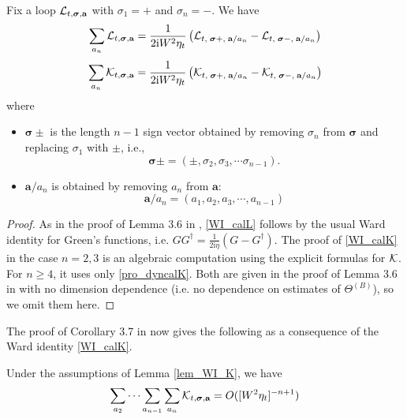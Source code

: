\begin{lemma}\label{lem_WI_K} Fix a loop ${\cal L}_{t, \boldsymbol{\sigma}, \textbf{a}}$ with 
$\sigma_1=+$ and $\sigma_n=-$. We have
\begin{equation}\label{WI_calL}
  \sum_{a_n}{\cal L}_{t, \boldsymbol{\sigma}, \textbf{a}}=
\frac{1}{2\mathrm{i}W^{2}\eta_t}\left({\cal L}_{t, \; \boldsymbol{\sigma}+,  \; \textbf{a}/a_n}- {\cal L}_{t, \; \boldsymbol{\sigma}-,  \; \textbf{a}/a_n}\right)  
\end{equation}
\begin{equation}\label{WI_calK}
  \sum_{a_n}{\cal K}_{t, \boldsymbol{\sigma}, \textbf{a}}=
\frac{1}{2\mathrm{i}W^{2}\eta_t}\left({\cal K}_{t, \; \boldsymbol{\sigma}+,  \; \textbf{a}/a_n}
- {\cal K}_{t, \; \boldsymbol{\sigma}-,  \; \textbf{a}/a_n}\right)  
\end{equation}
where 
\begin{itemize}
\item  $\boldsymbol{\sigma}\pm$ is the length $n-1$ sign vector obtained by removing $\sigma_n$ from $\boldsymbol{\sigma}$ and replacing $\sigma_1$ with $\pm$, i.e., 
    $$
\boldsymbol{\sigma}\pm=(\pm, \sigma_2, \sigma_3,\cdots \sigma_{ n-1}).$$
\item  $\textbf{a}/a_n$ is obtained by removing $a_n$ from $\textbf{a}$:
 $$
\textbf{a}/a_n=(a_1, a_2,a_3,\cdots, a_{n-1})
$$
\end{itemize}
\end{lemma}
\begin{proof}
As in the proof of Lemma 3.6 in \cite{YY_25}, \eqref{WI_calL} follows by the usual Ward identity for Green's functions, i.e. $GG^{\dagger}=\frac{1}{2\mathrm{i}\eta}(G-G^{\dagger})$. The proof of \eqref{WI_calK} in the case $n=2,3$ is an algebraic computation using the explicit formulas for ${\cal K}$. For $n\geq4$, it uses only \eqref{pro_dyncalK}. Both are given in the proof of Lemma 3.6 in \cite{YY_25} with no dimension dependence (i.e. no dependence on estimates of $\Theta^{(B)}$), so we omit them here.
\end{proof}

The proof of Corollary 3.7 in \cite{YY_25} now gives the following as a consequence of the Ward identity \eqref{WI_calK}.

\begin{corollary}\label{lem_sumAinK}
    Under the assumptions of Lemma \ref{lem_WI_K}, we have 
\begin{align}\label{sumallAinK}
      \sum_{a_2}\cdots\sum_{a_{n-1}}\sum_{a_n}{\cal K}_{t, \boldsymbol{\sigma}, \textbf{a}}=O([W^{2}\eta_t]^{-n+1})
\end{align}
 \end{corollary}

